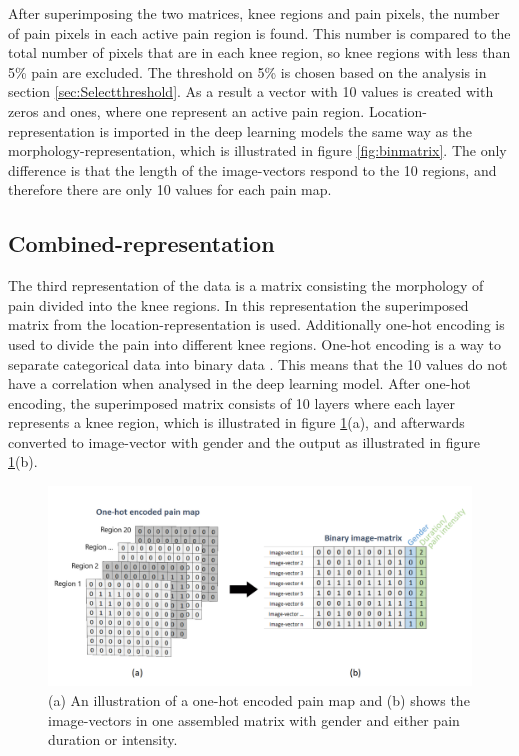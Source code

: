 \noindent
After superimposing the two matrices, knee regions and pain pixels, the number of pain pixels in each active pain region is found. This number is compared to the total number of pixels that are in each knee region, so knee regions with less than 5\% pain are excluded. The threshold on 5\% is chosen based on the analysis in section \ref{sec:Selectthreshold}. As a result a vector with 10 values is created with zeros and ones, where one represent an active pain region. Location-representation is imported in the deep learning models the same way as the morphology-representation, which is illustrated in figure \ref{fig:binmatrix}. The only difference is that the length of the image-vectors respond to the 10 regions, and therefore there are only 10 values for each pain map.


\subsection{Combined-representation} \label{sec:combined}
The third representation of the data is a matrix consisting the morphology of pain divided into the knee regions.
\noindent
In this representation the superimposed matrix from the location-representation is used. Additionally one-hot encoding is used to divide the pain into different knee regions. One-hot encoding is a way to separate categorical data into binary data \citep{Harris2012}. This means that the 10 values do not have a correlation when analysed in the deep learning model. After one-hot encoding, the superimposed matrix consists of 10 layers where each layer represents a knee region, which is illustrated in figure \ref{fig:onehot}(a), and afterwards converted to image-vector with gender and the output as illustrated in figure \ref{fig:onehot}(b).

\begin{figure} [H]
\centering
\includegraphics[width=1\textwidth]{figures/onehotmatrix}
\caption{(a) An illustration of a one-hot encoded pain map and (b) shows the image-vectors in one assembled matrix with gender and either pain duration or intensity.}
\label{fig:onehot}
\end{figure}

